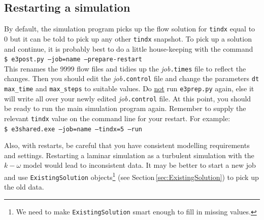 \subsection{Restarting a simulation}
%
By default, the simulation program picks up the flow solution for \texttt{tindx} equal to 0 but
it can be told to pick up any other \texttt{tindx} snapshot.
To pick up a solution and continue, it is probably best to do a little house-keeping with the command\\
\texttt{\$ e3post.py --job=name --prepare-restart}\\
This renames the 9999 flow files and tidies up the \textit{job}\texttt{.times} file to reflect the changes.
Then you should edit the \textit{job}\texttt{.control} file and change the parameters \texttt{dt}
\texttt{max\_time} and \texttt{max\_steps} to suitable values.
Do \underline{not} run \texttt{e3prep.py} again, else it will write all over 
your newly edited \textit{job}\texttt{.control} file.
At this point, you should be ready to run the main simulation program again.
Remember to supply the relevant \texttt{tindx} value on the command line for your restart.
For example:\\
\texttt{\$ e3shared.exe --job=name --tindx=5 --run}

\medskip
Also, with restarts, be careful that you have consistent modelling requirements and settings.
Restarting a laminar simulation as a turbulent simulation with the $k-\omega$ model would lead
to inconsistent data.
It may be better to start a new job and use \texttt{ExistingSolution} objects\footnote{We need to make \texttt{ExistingSolution} smart enough to fill in missing values.} (see Section\,\ref{sec:ExistingSolution}) to pick up the old data. 

\newpage
